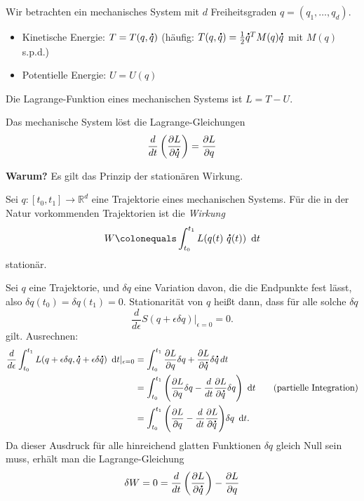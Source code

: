 \documentclass[german]{scrreprt}
\let\emph\textbf
\newcommand{\R}{\mathbb R}
\newcommand{\diffskip}[1]{\enskip \mathrm{d}#1}
\newcommand{\dt}{\diffskip{t}}
\theoremstyle{plain}
\theoremstyle{nonumberplain}
\theoremstyle{nonumberplain}
\theoremstyle{nonumberplain}
\renewcommand*{\dot}[1]{\accentset{\mbox{\large\bfseries .}}{#1}}
\begin{document}
Wir betrachten ein mechanisches System mit $d$ Freiheitsgraden $q = (q_1, \dots, q_d)$.
\begin{itemize}
	\item Kinetische Energie: $T = T(q, \dot q)$
	(häufig: $T(q, \dot{q}) = \frac12 \dot{q}^T M(q) \dot{q}$ mit $M(q)$ s.p.d.)
	\item Potentielle Energie: $U = U(q)$
\end{itemize}

\begin{definition}
  Die Lagrange-Funktion eines mechanischen Systems ist $L = T - U$.
\end{definition}

Das mechanische System löst die Lagrange-Gleichungen
\begin{equation*}
  \frac{d}{dt} \left( \frac{\partial L}{\partial \dot q} \right) = \frac{\partial L}{\partial q}
\end{equation*}

\emph{Warum?} Es gilt das Prinzip der stationären Wirkung.

\begin{definition}
	Sei $q: [t_0, t_1] \to \R^d$ eine Trajektorie eines mechanischen Systems.
	Für die in der Natur vorkommenden Trajektorien ist die \textit{Wirkung}
	\begin{equation*}
		W \colonequals \int_{t_0}^{t_1} L(q(t) \ \dot q(t)) \dt
	\end{equation*}
	stationär.
\end{definition}

Sei $q$ eine Trajektorie, und $\delta q$ eine Variation davon, die die Endpunkte fest lässt, also $\delta q(t_0)=\delta q(t_1) = 0$.
Stationarität von $q$ heißt dann, dass für alle solche $\delta q$
\begin{equation*}
	\frac{d}{d\epsilon} S(q+\epsilon\delta q)\vert_{\epsilon=0} = 0.
\end{equation*}
gilt. Ausrechnen:
\begin{align*}
	\frac{d}{d\epsilon} \int_{t_0}^{t_1} L(q+ \epsilon\delta q,\dot q + \epsilon\delta \dot q)\dt\vert_{\epsilon=0} &= \int_{t_0}^{t_1} \frac{\partial L}{\partial q}\delta q + \frac{\partial L}{\partial\dot q} \delta\dot q\, dt \\
	&= \int_{t_0}^{t_1} \Bigg(\frac{\partial L}{\partial q} \delta q - \frac{d}{dt} \frac{\partial L}{\partial \dot q} \delta q\Bigg)\dt \tag{partielle Integration} \\
	&= \int_{t_0}^{t_1} \Bigg(\frac{\partial L}{\partial q} - \frac{d}{dt} \frac{\partial L}{\partial \dot q}  \Bigg)\delta q\dt.
\end{align*}
Da dieser Ausdruck für alle hinreichend glatten Funktionen $\delta q$ gleich Null sein muss, erhält man die Lagrange-Gleichung
\begin{equation*}
  \delta W = 0 = \frac{d}{dt} \left( \frac{\partial L}{\partial \dot q} \right) - \frac{\partial L}{\partial q}
\end{equation*}
\end{document}
